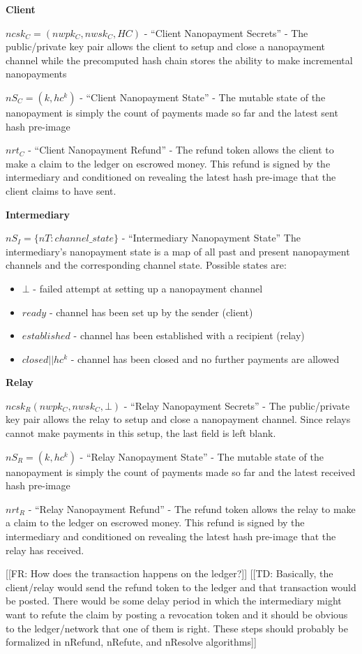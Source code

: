 \documentclass{article}
\newcommand{\flo}[1]{ {\color{blue} [[FR: #1]]}}
\newcommand{\thi}[1]{ {\color{red} [[TD: #1]]}}
\begin{document}
\textbf{Client}

$ncsk_C = (nwpk_C, nwsk_C, HC)$ - ``Client Nanopayment Secrets'' - The
public/private key pair allows the client to setup and close a
nanopayment channel while the precomputed hash chain stores the
ability to make incremental nanopayments

$nS_C = (k, hc^k)$ - ``Client Nanopayment State'' - The mutable state
of the nanopayment is simply the count of payments made so far and the
latest sent hash pre-image

$nrt_C$ - ``Client Nanopayment Refund'' - The refund token allows the
client to make a claim to the ledger on escrowed money. This refund is
signed by the intermediary and conditioned on revealing the latest
hash pre-image that the client claims to have sent.

\textbf{Intermediary}

$nS_I = \{nT: channel\_state\}$ - ``Intermediary Nanopayment State''
The intermediary's nanopayment state is a map of all past and present
nanopayment channels and the corresponding channel state. Possible
states are:
\begin{itemize}
\item $\bot$ - failed attempt at setting up a nanopayment channel
\item $ready$ - channel has been set up by the sender (client)
\item $established$ - channel has been established with a recipient
  (relay)
\item $closed||hc^k$ - channel has been closed and no further payments
  are allowed
\end{itemize}

\textbf{Relay}

$ncsk_R (nwpk_C, nwsk_C, \bot)$ - ``Relay Nanopayment Secrets'' - The
public/private key pair allows the relay to setup and close a
nanopayment channel. Since relays cannot make payments in this setup,
the last field is left blank.

$nS_R = (k, hc^k)$ - ``Relay Nanopayment State'' - The mutable state
of the nanopayment is simply the count of payments made so far and the
latest received hash pre-image

$nrt_R$ - ``Relay Nanopayment Refund'' - The refund token allows the
relay to make a claim to the ledger on escrowed money. This refund is
signed by the intermediary and conditioned on revealing the latest
hash pre-image that the relay has received.

\flo{How does the transaction happens on the ledger?}
\thi{Basically, the client/relay would send the refund token to the ledger and that transaction would be posted. There would be some delay period in which the intermediary might want to refute the claim by posting a revocation token and it should be obvious to the ledger/network that one of them is right. These steps should probably be formalized in nRefund, nRefute, and nResolve algorithms}
\end{document}
